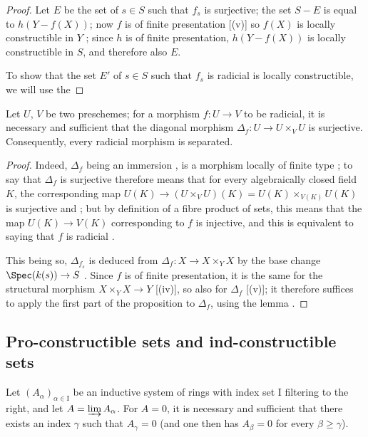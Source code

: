 \begin{proof}
Let $E$ be the set of $s\in S$ such that $f_s$ is surjective; the set $S-E$ is equal to $h(Y-f(X))$; now $f$ is of finite presentation [(v)] so $f(X)$ is locally constructible in $Y$ ; since $h$ is of finite presentation, $h(Y-f(X))$ is locally constructible in $S$, and therefore also $E$.

To show that the set $E'$ of $s\in S$ such that $f_s$ is radicial is locally constructible, we will use the
\end{proof}

\begin{lemma}[1.8.7.1]
\label{IV.1.8.7.1}
Let $U$, $V$ be two preschemes; for a morphism $f:U\to V$ to be radicial, it is necessary and sufficient that the diagonal morphism $\Delta_f:U\to U\times_V U$ is surjective.
Consequently, every radicial morphism is separated.
\end{lemma}

\begin{proof}
Indeed, $\Delta_f$ being an immersion , is a morphism locally of finite type ; to say that $\Delta_f$ is surjective therefore means that for every algebraically closed field $K$, the corresponding map $U(K)\to(U\times_V U)(K)=U(K)\times_{V(K)} U(K)$ is surjective  and ; but by definition of a fibre product of sets, this means that the map $U(K)\to V(K)$ corresponding to $f$ is injective, and this is equivalent to saying that $f$ is radicial .

This being so, $\Delta_{f_s}$ is deduced from $\Delta_f:X\to X\times_Y X$ by the base change $\Spec(k(s))\to S$ .
Since $f$ is of finite presentation, it is the same for the structural morphism $X\times_Y X\to Y$ [(iv)], so also for $\Delta_f$ [(v)]; it therefore suffices to apply the first part of the proposition to $\Delta_f$, using the lemma .
\end{proof}


\subsection{Pro-constructible sets and ind-constructible sets}
\label{subsection:IV.1.9}

\begin{lemma}[1.9.1]
\label{IV.1.9.1}
Let $(A_\alpha)_{\alpha\in\mathrm{I}}$ be an inductive system of rings with index set $\mathrm{I}$ filtering to the right, and let $A=\varinjlim A_\alpha$.
For $A=0$, it is necessary and sufficient that there exists an index $\gamma$ such that $A_\gamma=0$ (and one then has $A_\beta=0$ for every $\beta\geq\gamma$).
\end{lemma}

